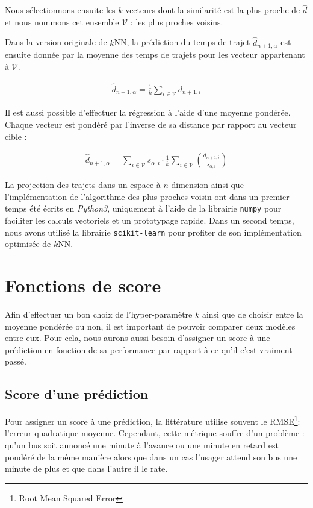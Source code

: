\documentclass[letterpaper]{article}
\begin{document}
Nous sélectionnons ensuite les $k$ vecteurs dont la similarité est la plus proche de $\hat{d}$ et nous nommons cet ensemble $\mathcal{V}$ : les plus proches voisins.

Dans la version originale de $k$NN, la prédiction du temps de trajet $\hat{d}_{n+1,\alpha}$ est ensuite donnée par la moyenne des temps de trajets pour les vecteur appartenant à $\mathcal{V}$.

\begin{eqnarray}
\hat{d}_{n+1,\alpha} = \frac{1}{k} \sum_{i \in \mathcal{V}}d_{n+1,i}
\end{eqnarray}

Il est aussi possible d'effectuer la régression à l'aide d'une moyenne pondérée. Chaque vecteur est pondéré par l'inverse de sa distance par rapport au vecteur cible :

\begin{eqnarray}
\hat{d}_{n+1,\alpha} = \sum_{i \in \mathcal{V}} s_{\alpha, i} \cdot \frac{1}{k} \sum_{i \in \mathcal{V}}( \frac{d_{n+1,i}}{s_{\alpha, i}})
\end{eqnarray}

La projection des trajets dans un espace à $n$ dimension ainsi que l'implémentation de l'algorithme des plus proches voisin ont dans un premier temps été écrits en \textit{Python3}, uniquement à l'aide de la librairie \texttt{numpy} pour faciliter les calculs vectoriels et un prototypage rapide. Dans un second temps, nous avons utilisé la librairie \texttt{scikit-learn} pour profiter de son implémentation optimisée de $k$NN.

\section{Fonctions de score}

Afin d'effectuer un bon choix de l'hyper-paramètre $k$ ainsi que de choisir entre la moyenne pondérée ou non, il est important de pouvoir comparer deux modèles entre eux. Pour cela, nous aurons aussi besoin d'assigner un score à une prédiction en fonction de sa performance par rapport à ce qu'il c'est vraiment passé.

\subsection{Score d'une prédiction}
Pour assigner un score à une prédiction, la littérature utilise souvent le RMSE\footnote{Root Mean Squared Error}: l'erreur quadratique moyenne.
Cependant, cette métrique souffre d'un problème :
qu'un bus soit annoncé une minute à l'avance ou une minute en retard est pondéré de la même manière alors que dans un cas l'usager attend son bus une minute de plus et que dans l'autre il le rate.
\end{document}

